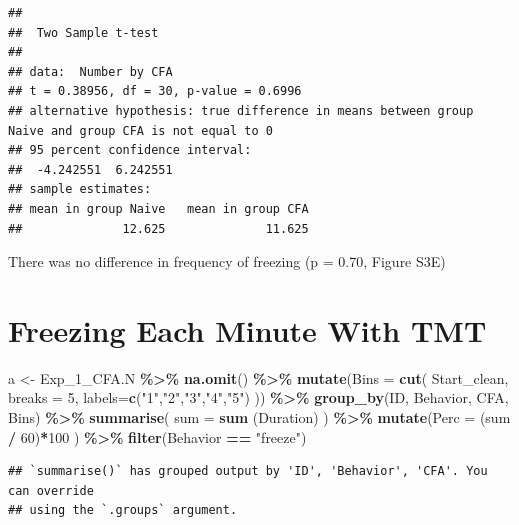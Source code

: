 \documentclass[
]{book}
\newenvironment{Shaded}{\begin{snugshade}}{\end{snugshade}}
\newcommand{\AttributeTok}[1]{\textcolor[rgb]{0.13,0.29,0.53}{#1}}
\newcommand{\DecValTok}[1]{\textcolor[rgb]{0.00,0.00,0.81}{#1}}
\newcommand{\FunctionTok}[1]{\textcolor[rgb]{0.13,0.29,0.53}{\textbf{#1}}}
\newcommand{\NormalTok}[1]{#1}
\newcommand{\OtherTok}[1]{\textcolor[rgb]{0.56,0.35,0.01}{#1}}
\newcommand{\SpecialCharTok}[1]{\textcolor[rgb]{0.81,0.36,0.00}{\textbf{#1}}}
\newcommand{\StringTok}[1]{\textcolor[rgb]{0.31,0.60,0.02}{#1}}
\begin{document}
\begin{verbatim}
## 
##  Two Sample t-test
## 
## data:  Number by CFA
## t = 0.38956, df = 30, p-value = 0.6996
## alternative hypothesis: true difference in means between group Naive and group CFA is not equal to 0
## 95 percent confidence interval:
##  -4.242551  6.242551
## sample estimates:
## mean in group Naive   mean in group CFA 
##              12.625              11.625
\end{verbatim}

There was no difference in frequency of freezing (p = 0.70, Figure S3E)

\section*{Freezing Each Minute With TMT}\label{freezing-each-minute-with-tmt}

\begin{Shaded}
\begin{Highlighting}[]
\NormalTok{a }\OtherTok{\textless{}{-}}\NormalTok{ Exp\_1\_CFA.N }\SpecialCharTok{\%\textgreater{}\%}
  \FunctionTok{na.omit}\NormalTok{() }\SpecialCharTok{\%\textgreater{}\%}
  \FunctionTok{mutate}\NormalTok{(}\AttributeTok{Bins =} \FunctionTok{cut}\NormalTok{(}
\NormalTok{    Start\_clean,}
    \AttributeTok{breaks =} \DecValTok{5}\NormalTok{,}
    \AttributeTok{labels=}\FunctionTok{c}\NormalTok{(}\StringTok{"1"}\NormalTok{,}\StringTok{"2"}\NormalTok{,}\StringTok{"3"}\NormalTok{,}\StringTok{"4"}\NormalTok{,}\StringTok{"5"}\NormalTok{)}
\NormalTok{  )) }\SpecialCharTok{\%\textgreater{}\%}
  \FunctionTok{group\_by}\NormalTok{(ID, Behavior, CFA, Bins) }\SpecialCharTok{\%\textgreater{}\%}
  \FunctionTok{summarise}\NormalTok{(}
    \AttributeTok{sum =} \FunctionTok{sum}\NormalTok{ (Duration)}
\NormalTok{  ) }\SpecialCharTok{\%\textgreater{}\%}
  \FunctionTok{mutate}\NormalTok{(}\AttributeTok{Perc =}\NormalTok{ (sum }\SpecialCharTok{/} \DecValTok{60}\NormalTok{)}\SpecialCharTok{*}\DecValTok{100}\NormalTok{ ) }\SpecialCharTok{\%\textgreater{}\%}
  \FunctionTok{filter}\NormalTok{(Behavior }\SpecialCharTok{==} \StringTok{"freeze"}\NormalTok{)}
\end{Highlighting}
\end{Shaded}

\begin{verbatim}
## `summarise()` has grouped output by 'ID', 'Behavior', 'CFA'. You can override
## using the `.groups` argument.
\end{verbatim}
\end{document}
